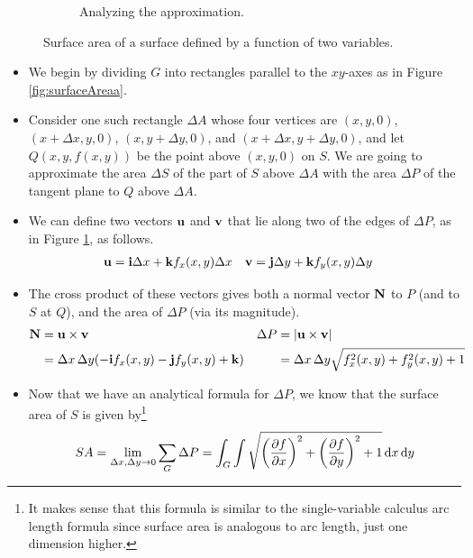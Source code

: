 \documentclass[../main.tex]{subfiles}
\begin{document}
\begin{itemize}
\begin{figure}[h!]
\begin{subfigure}[b]{0.4\linewidth}
            \caption{Analyzing the approximation.}
            \label{fig:surfaceAreab}
        \end{subfigure}
        \caption{Surface area of a surface defined by a function of two variables.}
        \label{fig:surfaceArea}
    \end{figure}
    \begin{itemize}
        \item We begin by dividing $G$ into rectangles parallel to the $xy$-axes as in Figure \ref{fig:surfaceAreaa}.
        \item Consider one such rectangle $\Delta A$ whose four vertices are $(x,y,0)$, $(x+\Delta x,y,0)$, $(x,y+\Delta y,0)$, and $(x+\Delta x,y+\Delta y,0)$, and let $Q(x,y,f(x,y))$ be the point above $(x,y,0)$ on $S$. We are going to approximate the area $\Delta S$ of the part of $S$ above $\Delta A$ with the area $\Delta P$ of the tangent plane to $Q$ above $\Delta A$.
        \item We can define two vectors $\vb{u}$ and $\vb{v}$ that lie along two of the edges of $\Delta P$, as in Figure \ref{fig:surfaceAreab}, as follows.
        \begin{align*}
            \vb{u} &= \vb{i}\Delta x+\vb{k}f_x(x,y)\Delta x&
                \vb{v} &= \vb{j}\Delta y+\vb{k}f_y(x,y)\Delta y
        \end{align*}
        \item The cross product of these vectors gives both a normal vector $\vb{N}$ to $P$ (and to $S$ at $Q$), and the area of $\Delta P$ (via its magnitude).
        \begin{align*}
            \vb{N} &= \vb{u}\times\vb{v}&
                \Delta P &= |\vb{u}\times\vb{v}|\\
            &= \Delta x\, \Delta y(-\vb{i}f_x(x,y)-\vb{j}f_y(x,y)+\vb{k})&
                &= \Delta x\, \Delta y\sqrt{f_x^2(x,y)+f_y^2(x,y)+1}
        \end{align*}
        \item Now that we have an analytical formula for $\Delta P$, we know that the surface area of $S$ is given by\footnote{It makes sense that this formula is similar to the single-variable calculus arc length formula since surface area is analogous to arc length, just one dimension higher.}
        \begin{equation*}
            SA = \lim_{\Delta x,\Delta y\to 0}\sum_G\Delta P
            = \int_G\int\sqrt{\left( \pdv{f}{x} \right)^2+\left( \pdv{f}{y} \right)^2+1}\dd{x}\dd{y}
        \end{equation*}

\end{itemize}
\end{itemize}
\end{document}
